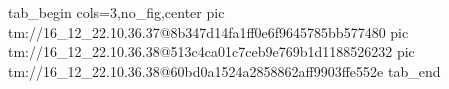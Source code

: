  
 
 
 
 

\qqSecOrig


\ifcmt
  tab_begin cols=3,no_fig,center
    pic tm://16_12_22.10.36.37@8b347d14fa1ff0e6f9645785bb577480
    pic tm://16_12_22.10.36.38@513c4ca01c7ceb9e769b1d1188526232
    pic tm://16_12_22.10.36.38@60bd0a1524a2858862aff9903ffe552e
  tab_end
\fi

